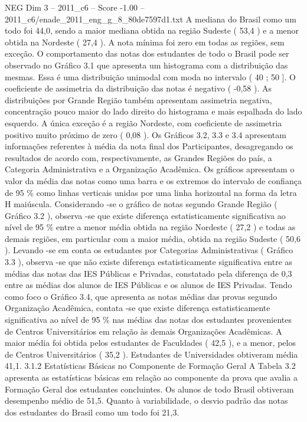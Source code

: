 \begin{textsample}{NEG Dim 3 – 2011\_c6 – Score -1.00 – 2011\_c6/enade\_2011\_eng\_g\_8\_80de7597d1.txt}
A mediana do Brasil como um todo foi 44,0, sendo a maior mediana obtida na região Sudeste ( 53,4 ) e a menor obtida na Nordeste ( 27,4 ).
A nota mínima foi zero em todas as regiões, sem exceção.
O comportamento das notas dos estudantes de todo o Brasil pode ser observado no Gráfico 3.1 que apresenta um histograma com a distribuição das mesmas.
Essa é uma distribuição unimodal com moda no intervalo ( 40 ; 50 ].
O coeficiente de assimetria da distribuição das notas é negativo ( -0,58 ).
As distribuições por Grande Região também apresentam assimetria negativa, concentração pouco maior do lado direito do histograma e mais espalhada do lado esquerdo.
A única exceção é a região Nordeste, com coeficiente de assimetria positivo muito próximo de zero ( 0,08 ).
Os Gráficos 3.2, 3.3 e 3.4 apresentam informações referentes à média da nota final dos Participantes, desagregando os resultados de acordo com, respectivamente, as Grandes Regiões do país, a Categoria Administrativa e a Organização Acadêmica.
Os gráficos apresentam o valor da média das notas como uma barra e os extremos do intervalo de confiança de 95 \% como linhas verticais unidas por uma linha horizontal na forma da letra H maiúscula.
Considerando -se o gráfico de notas segundo Grande Região ( Gráfico 3.2 ), observa -se que existe diferença estatisticamente significativa ao nível de 95 \% entre a menor média obtida na região Nordeste ( 27,2 ) e todas as demais regiões, em particular com a maior média, obtida na região Sudeste ( 50,6 ).
Levando -se em conta os estudantes por Categorias Administrativas ( Gráfico 3.3 ), observa -se que não existe diferença estatisticamente significativa entre as médias das notas das IES Públicas e Privadas, constatado pela diferença de 0,3 entre as médias dos alunos de IES Públicas e os alunos de IES Privadas.
Tendo como foco o Gráfico 3.4, que apresenta as notas médias das provas segundo Organização Acadêmica, contata -se que existe diferença estatisticamente significativa ao nível de 95 \% nas médias das notas dos estudantes provenientes de Centros Universitários em relação às demais Organizações Acadêmicas.
A maior média foi obtida pelos estudantes de Faculdades ( 42,5 ), e a menor, pelos de Centros Universitários ( 35,2 ).
Estudantes de Universidades obtiveram média 41,1. 3.1.2 Estatísticas Básicas no Componente de Formação Geral A Tabela 3.2 apresenta as estatísticas básicas em relação ao componente da prova que avalia a Formação Geral dos estudantes concluintes.
Os alunos de todo Brasil obtiveram desempenho médio de 51,5.
Quanto à variabilidade, o desvio padrão das notas dos estudantes do Brasil como um todo foi 21,3.

\end{textsample}
